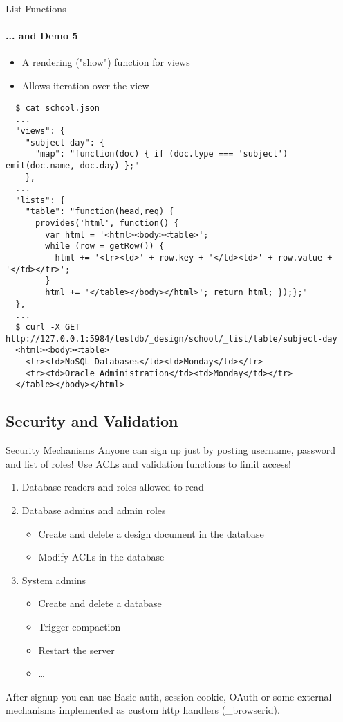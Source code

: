 \documentclass{beamer}
\begin{document}
\begin{frame}[fragile]{List Functions}
  \framesubtitle{... and Demo 5}
  \begin{itemize}
    \item A rendering ("show") function for views
    \item Allows iteration over the view
  \end{itemize}
  \fontsize{6}{8}\selectfont
  \begin{verbatim}
  $ cat school.json
  ...
  "views": {
    "subject-day": {
      "map": "function(doc) { if (doc.type === 'subject') emit(doc.name, doc.day) };"	
    },
  ...
  "lists": {
    "table": "function(head,req) {
      provides('html', function() {
        var html = '<html><body><table>';
        while (row = getRow()) {
          html += '<tr><td>' + row.key + '</td><td>' + row.value + '</td></tr>';
        }
        html += '</table></body></html>'; return html; });};"
  },
  ...
  $ curl -X GET http://127.0.0.1:5984/testdb/_design/school/_list/table/subject-day
  <html><body><table>
    <tr><td>NoSQL Databases</td><td>Monday</td></tr>
    <tr><td>Oracle Administration</td><td>Monday</td></tr>
  </table></body></html>
  \end{verbatim}
\end{frame}

\subsection{Security and Validation}
\begin{frame}{Security Mechanisms}
  Anyone can sign up just by posting username, password and list of roles!
  Use ACLs and validation functions to limit access!
  \begin{enumerate}
    \item Database readers and roles allowed to read
    \item Database admins and admin roles
    \begin{itemize}
      \item Create and delete a design document in the database
      \item Modify ACLs in the database
    \end{itemize}
    \item System admins
    \begin{itemize}
      \item Create and delete a database
      \item Trigger compaction
      \item Restart the server
      \item \ldots
    \end{itemize}
  \end{enumerate}
  After signup you can use Basic auth, session cookie, OAuth or some external
  mechanisms implemented as custom http handlers (\_browserid).
\end{frame}
\end{document}
